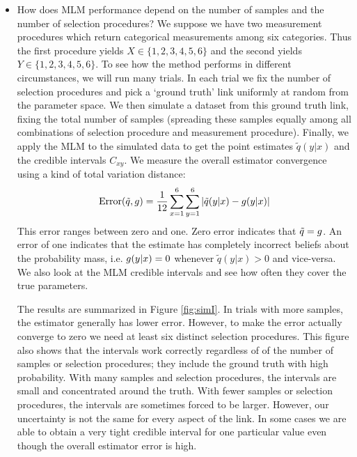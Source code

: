 \begin{itemize}
    \item How does MLM performance depend on the number of samples and the number of selection procedures?  We suppose we have two measurement procedures which return categorical measurements among six categories.  Thus the first procedure yields $X\in \{1,2,3,4,5,6\}$ and the second yields $Y\in \{1,2,3,4,5,6\}$.  To see how the method performs in different circumstances, we will run many trials.  In each trial we fix the number of selection procedures and pick a `ground truth' link uniformly at random from the parameter space.  We then simulate a dataset from this ground truth link, fixing the total number of samples (spreading these samples equally among all combinations of selection procedure and measurement procedure).  Finally, we apply the MLM to the simulated data to get the point estimates $\tilde q(y|x)$ and the credible intervals $C_{x y}$.  We measure the overall estimator convergence using a kind of total variation distance:
    \[
    \mathrm{Error}(\tilde q,g)=\frac{1}{12}\sum_{x=1}^{6}\sum_{y=1}^{6} |\tilde q(y|x) - g(y|x)|
    \]
    This error ranges between zero and one.  Zero error indicates that $\tilde q=g$. An error of one indicates that the estimate has completely incorrect beliefs about the probability mass, i.e. $g(y|x)=0$ whenever $\tilde q(y|x)>0$ and vice-versa.  We also look at the MLM credible intervals and see how often they cover the true parameters.  

    The results are summarized in Figure \ref{fig:simI}.  In trials with more samples, the estimator generally has lower error.  However, to make the error actually converge to zero we need at least six distinct selection procedures.  This figure also shows that the intervals work correctly regardless of of the number of samples or selection procedures; they include the ground truth with high probability.   With many samples and selection procedures, the intervals are small and concentrated around the truth.  With fewer samples or selection procedures, the intervals are sometimes forced to be larger.  However, our uncertainty is not the same for every aspect of the link.  In some cases we are able to obtain a very tight credible interval for one particular value even though the overall estimator error is high.  


\end{itemize}
